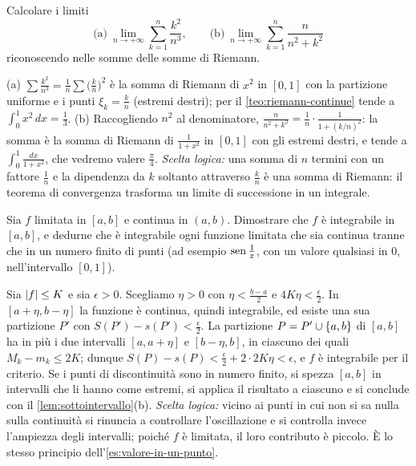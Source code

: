 \begin{esercizio}\label{es:limiti-riemann}
Calcolare i limiti
\[
  \text{(a)}\ \lim_{n\to+\infty}\sum_{k=1}^{n}\frac{k^{2}}{n^{3}}, \qquad
  \text{(b)}\ \lim_{n\to+\infty}\sum_{k=1}^{n}\frac n{n^{2}+k^{2}}
\]
riconoscendo nelle somme delle somme di Riemann.
\begin{soluzione}
(a) $\sum\frac{k^{2}}{n^{3}}=\frac1n\sum\bigl(\frac kn\bigr)^{2}$ è la somma di Riemann di $x^{2}$
in $[0,1]$ con la partizione uniforme e i punti $\xi_{k}=\frac kn$ (estremi destri); per
il \cref{teo:riemann-continue} tende a $\int_{0}^{1}x^{2}\,dx=\frac13$. (b) Raccogliendo
$n^{2}$ al denominatore, $\frac n{n^{2}+k^{2}}=\frac1n\cdot\frac1{1+(k/n)^{2}}$: la somma è la
somma di Riemann di $\frac1{1+x^{2}}$ in $[0,1]$ con gli estremi destri, e tende a
$\int_{0}^{1}\frac{dx}{1+x^{2}}$, che vedremo valere $\frac\pi4$. \emph{Scelta logica:}
una somma di $n$ termini con un fattore $\frac1n$ e la dipendenza da $k$ soltanto
attraverso $\frac kn$ è una somma di Riemann: il teorema di convergenza trasforma un
limite di successione in un integrale.
\end{soluzione}
\end{esercizio}

\begin{esercizio}\label{es:continua-tratti}
Sia $f$ limitata in $[a,b]$ e continua in $(a,b)$. Dimostrare che $f$ è integrabile
in $[a,b]$, e dedurne che è integrabile ogni funzione limitata che sia continua tranne
che in un numero finito di punti (ad esempio $\operatorname{sen}\frac1x$, con un valore qualsiasi in
$0$, nell'intervallo $[0,1]$).
\begin{soluzione}
Sia $\lvert f\rvert\le K$ e sia $\epsilon>0$. Scegliamo $\eta>0$ con $\eta<\frac{b-a}2$ e
$4K\eta<\frac\epsilon2$. In $[a+\eta,b-\eta]$ la funzione è continua, quindi integrabile,
ed esiste una sua partizione $P'$ con $S(P')-s(P')<\frac\epsilon2$. La partizione
$P=P'\cup\left\{ a,b \right\}$ di $[a,b]$ ha in più i due intervalli $[a,a+\eta]$ e $[b-\eta,b]$, in
ciascuno dei quali $M_{k}-m_{k}\le2K$; dunque
$S(P)-s(P)<\frac\epsilon2+2\cdot2K\eta<\epsilon$, e $f$ è integrabile per il criterio. Se i
punti di discontinuità sono in numero finito, si spezza $[a,b]$ in intervalli che li
hanno come estremi, si applica il risultato a ciascuno e si conclude con il
\cref{lem:sottointervallo}(b). \emph{Scelta logica:} vicino ai punti in cui non si sa
nulla sulla continuità si rinuncia a controllare l'oscillazione e si controlla invece
l'ampiezza degli intervalli; poiché $f$ è limitata, il loro contributo è piccolo. È lo stesso principio
dell'\cref{es:valore-in-un-punto}.
\end{soluzione}
\end{esercizio}

